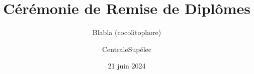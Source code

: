 \documentclass{beamer}
\title[Cérémonie de Remise de Diplômes CentraleSupélec - 21 juin 2024]{Cérémonie de Remise de Diplômes}
\subtitle{Blabla (cocolitophore)}
\author{CentraleSupélec}
\institute{14h - Amphithéâtre Michelin}
\date{21 juin 2024}
\begin{document}
\begin{frame}[plain]
  \titlepage
\end{frame}


\end{document}
